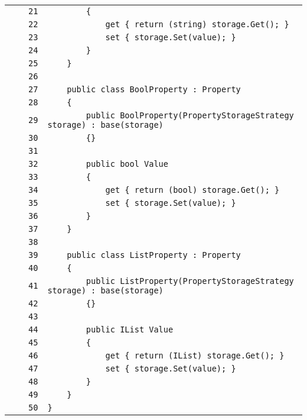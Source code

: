 \documentclass[a4paper,10pt]{article}
\begin{document}
\begin{longtable}[l]{lrrl}
\cellcolor{gray} &  & \verb~21~ & \verb~        {~\\
\cellcolor{gray} &  & \verb~22~ & \verb~            get { return (string) storage.Get(); }~\\
\cellcolor{gray} &  & \verb~23~ & \verb~            set { storage.Set(value); }~\\
\cellcolor{gray} &  & \verb~24~ & \verb~        }~\\
\cellcolor{gray} &  & \verb~25~ & \verb~    }~\\
\cellcolor{gray} &  & \verb~26~ & \verb~~\\
\cellcolor{gray} &  & \verb~27~ & \verb~    public class BoolProperty : Property~\\
\cellcolor{gray} &  & \verb~28~ & \verb~    {~\\
\cellcolor{gray} &  & \verb~29~ & \verb~        public BoolProperty(PropertyStorageStrategy storage) : base(storage)~\\
\cellcolor{gray} &  & \verb~30~ & \verb~        {}~\\
\cellcolor{gray} &  & \verb~31~ & \verb~~\\
\cellcolor{gray} &  & \verb~32~ & \verb~        public bool Value~\\
\cellcolor{gray} &  & \verb~33~ & \verb~        {~\\
\cellcolor{gray} &  & \verb~34~ & \verb~            get { return (bool) storage.Get(); }~\\
\cellcolor{gray} &  & \verb~35~ & \verb~            set { storage.Set(value); }~\\
\cellcolor{gray} &  & \verb~36~ & \verb~        }~\\
\cellcolor{gray} &  & \verb~37~ & \verb~    }~\\
\cellcolor{gray} &  & \verb~38~ & \verb~~\\
\cellcolor{gray} &  & \verb~39~ & \verb~    public class ListProperty : Property~\\
\cellcolor{gray} &  & \verb~40~ & \verb~    {~\\
\cellcolor{gray} &  & \verb~41~ & \verb~        public ListProperty(PropertyStorageStrategy storage) : base(storage)~\\
\cellcolor{gray} &  & \verb~42~ & \verb~        {}~\\
\cellcolor{gray} &  & \verb~43~ & \verb~~\\
\cellcolor{gray} &  & \verb~44~ & \verb~        public IList Value~\\
\cellcolor{gray} &  & \verb~45~ & \verb~        {~\\
\cellcolor{gray} &  & \verb~46~ & \verb~            get { return (IList) storage.Get(); }~\\
\cellcolor{gray} &  & \verb~47~ & \verb~            set { storage.Set(value); }~\\
\cellcolor{gray} &  & \verb~48~ & \verb~        }~\\
\cellcolor{gray} &  & \verb~49~ & \verb~    }~\\
\cellcolor{gray} &  & \verb~50~ & \verb~}~\\
\end{longtable}
\newpage
\end{document}
